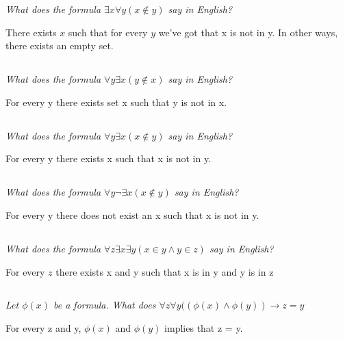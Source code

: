 \documentclass[11pt,oneside,titlepage]{book}
\begin{document}
\textit{What does the formula $\exists x \forall y (x \notin y)$ say in English? }

There exists $x$ such that for every $y$ we've got that x is not in y. In other ways, there
exists an empty set.

\subsection{}

\textit{What does the formula $\forall y \exists x (y \notin x)$ say in English?}

For every y there exists set x such that y is not in x.

\subsection{}

\textit{What does the formula $\forall y \exists x (x \notin y)$ say in English?}

For every y there exists x such that x is not in y.

\subsection{}

\textit{What does the formula $\forall y \neg \exists x (x \notin y)$ say in English?}

For every y there does not exist an x such that x is not in y.

\subsection{}

\textit{What does the formula $\forall z \exists x \exists y (x \in y \land y \in z)$
  say in English?}

For every $z$ there exists x and y such that x is in y and y is in z

\subsection{}

\textit{Let $\phi(x)$ be a formula. What does $\forall z \forall y((\phi(x) \land \phi(y))
  \to z = y$}

For every z and y, $\phi(x)$ and $\phi(y)$ implies that z = y.

\subsection{}
\end{document}
